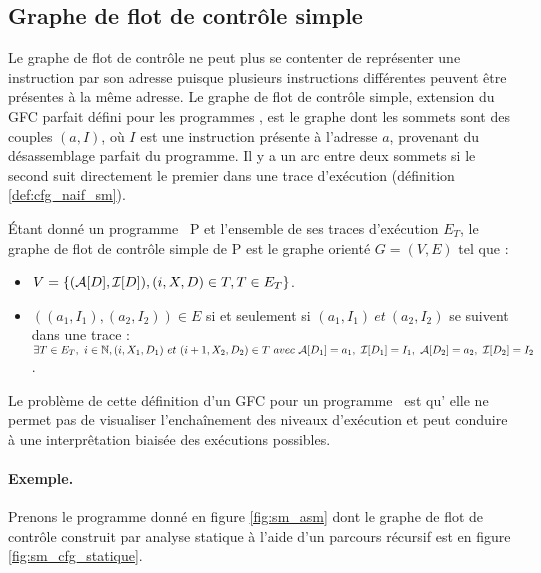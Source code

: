 \subsection{Graphe de flot de contrôle simple}
Le graphe de flot de contrôle ne peut plus se contenter de représenter
une instruction par son adresse puisque plusieurs instructions
différentes peuvent être présentes à la même adresse.
Le graphe de flot de contrôle simple, extension du GFC parfait défini pour les programmes \nsms, est le graphe dont les sommets sont des couples $(a, I)$, où $I$ est une instruction présente à l'adresse $a$, provenant du désassemblage parfait du programme. Il y a un arc entre deux sommets si le second suit directement le premier dans une trace d'exécution (définition \ref{def:cfg_naif_sm}).

\begin{defi}
 Étant donné un programme \sm\ P et l'ensemble de ses traces d'exécution
$E_T$, le graphe de flot de contrôle simple de P est le graphe orienté
$G=(V, E)$ tel que :

 \begin{itemize}
  \item $V=\{(\mathcal A[D], \mathcal I[D]), (i, X, D)\in T, T\in E_T\}$.
  \item $((a_1, I_1), (a_2, I_2))\in E$ si et seulement si $(a_1,
I_1)\ et\ (a_2, I_2)$ se suivent dans une trace : $\exists T\in
E_T,\ i\in \BN, (i, X_1, D_1)\ et\ (i+1, X_2, D_2)\in T\ avec\
\mda{D_1}=a_1,\ \mdi{D_1}=I_1,~\mda{D_2}=a_2,\ \mdi{D_2}=I_2$.
 \end{itemize}
\label{def:cfg_naif_sm}
\end{defi}

Le problème de cette définition d'un GFC pour un programme \sm\ est qu'%
elle ne permet pas de visualiser l'enchaînement des niveaux d'exécution et peut conduire à une interprêtation biaisée des exécutions possibles.

\paragraph{Exemple.}
Prenons le programme donné en figure \ref{fig:sm_asm} dont le graphe de flot de contrôle construit par analyse statique à l'aide d'un parcours récursif est en figure \ref{fig:sm_cfg_statique}.

